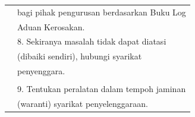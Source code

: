 \documentclass[
]{article}
\begin{document}
\begin{longtable}[]{@{}ll@{}}
\begin{minipage}[t]{0.23\columnwidth}
\strut
\end{minipage} & \begin{minipage}[t]{0.71\columnwidth}\raggedright
bagi pihak pengurusan berdasarkan Buku Log\strut
\end{minipage}\tabularnewline
\begin{minipage}[t]{0.23\columnwidth}\raggedright
\strut
\end{minipage} & \begin{minipage}[t]{0.71\columnwidth}\raggedright
Aduan Kerosakan.\strut
\end{minipage}\tabularnewline
\begin{minipage}[t]{0.23\columnwidth}\raggedright
\strut
\end{minipage} & \begin{minipage}[t]{0.71\columnwidth}\raggedright
8. Sekiranya masalah tidak dapat diatasi\strut
\end{minipage}\tabularnewline
\begin{minipage}[t]{0.23\columnwidth}\raggedright
\strut
\end{minipage} & \begin{minipage}[t]{0.71\columnwidth}\raggedright
(dibaiki sendiri), hubungi syarikat\strut
\end{minipage}\tabularnewline
\begin{minipage}[t]{0.23\columnwidth}\raggedright
\strut
\end{minipage} & \begin{minipage}[t]{0.71\columnwidth}\raggedright
penyenggara.\strut
\end{minipage}\tabularnewline
\begin{minipage}[t]{0.23\columnwidth}\raggedright
\strut
\end{minipage} & \begin{minipage}[t]{0.71\columnwidth}\raggedright
\strut
\end{minipage}\tabularnewline
\begin{minipage}[t]{0.23\columnwidth}\raggedright
\strut
\end{minipage} & \begin{minipage}[t]{0.71\columnwidth}\raggedright
9. Tentukan peralatan dalam tempoh jaminan\strut
\end{minipage}\tabularnewline
\begin{minipage}[t]{0.23\columnwidth}\raggedright
\strut
\end{minipage} & \begin{minipage}[t]{0.71\columnwidth}\raggedright
(waranti) syarikat penyelenggaraan.\strut

\end{minipage}
\end{longtable}
\end{document}
